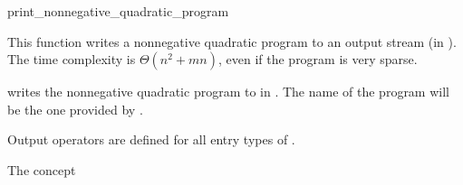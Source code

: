 \begin{ccRefFunction}{print_nonnegative_quadratic_program}


This function writes a nonnegative quadratic program
to an output stream (in ). The time
complexity is $\Theta (n^2 + mn)$, even if the program is very sparse.

{writes the nonnegative quadratic program  to  in 
. The name of the program will be the one provided 
by .}

Output operators are defined for all entry types of .

\ccExample
{}

\ccSeeAlso

The concept

\end{ccRefFunction}
